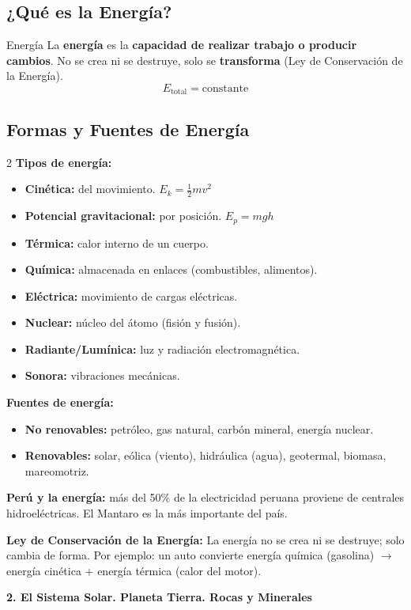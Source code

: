 \documentclass[11pt]{article}
\newcommand{\seccion}[2]{%
	\begin{tcolorbox}[colback=#1, colframe=#1, arc=4pt,
		left=8pt, right=8pt, top=4pt, bottom=4pt,
		before skip=12pt, after skip=6pt]
		\textbf{\large\color{white} #2}
	\end{tcolorbox}%
}
\begin{document}
	\subsection{¿Qué es la Energía?}
	\begin{defbox}{Energ\'ia}
		La \textbf{energ\'ia} es la \textbf{capacidad de realizar trabajo o producir cambios}. No se crea ni se destruye, solo se \textbf{transforma} (Ley de Conservaci\'on de la Energ\'ia).
		\[
		E_{\text{total}} = \text{constante}
		\]
	\end{defbox}
	\subsection{Formas y Fuentes de Energía}
	\begin{multicols}{2}
		\textbf{Tipos de energ\'ia:}
		\begin{itemize}[itemsep=3pt]
			\item \textbf{Cin\'etica:} del movimiento. $E_k = \frac{1}{2}mv^2$
			\item \textbf{Potencial gravitacional:} por posici\'on. $E_p = mgh$
			\item \textbf{T\'ermica:} calor interno de un cuerpo.
			\item \textbf{Qu\'imica:} almacenada en enlaces (combustibles, alimentos).
			\item \textbf{El\'ectrica:} movimiento de cargas el\'ectricas.
			\item \textbf{Nuclear:} n\'ucleo del \'atomo (fisi\'on y fusi\'on).
			\item \textbf{Radiante/Lum\'inica:} luz y radiaci\'on electromagn\'etica.
			\item \textbf{Sonora:} vibraciones mec\'anicas.
		\end{itemize}
		\columnbreak
		\textbf{Fuentes de energ\'ia:}
		\begin{itemize}[itemsep=3pt]
			\item \textbf{No renovables:} petr\'oleo, gas natural, carb\'on mineral, energ\'ia nuclear.
			\item \textbf{Renovables:} solar, e\'olica (viento), hidr\'aulica (agua), geotermal, biomasa, mareomotriz.
		\end{itemize}
		\vspace{0.3cm}
		\begin{databox}
			\textbf{Per\'u y la energ\'ia:} m\'as del 50\% de la electricidad peruana proviene de centrales hidroel\'ectricas. El Mantaro es la m\'as importante del pa\'is.
		\end{databox}
	\end{multicols}
	\begin{importantebox}
		\textbf{Ley de Conservaci\'on de la Energ\'ia:} La energ\'ia no se crea ni se destruye; solo cambia de forma. Por ejemplo: un auto convierte energ\'ia qu\'imica (gasolina) $\rightarrow$ energ\'ia cin\'etica + energ\'ia t\'ermica (calor del motor).
	\end{importantebox}
	\seccion{verdeprim}{2. El Sistema Solar. Planeta Tierra. Rocas y Minerales}
\end{document}
